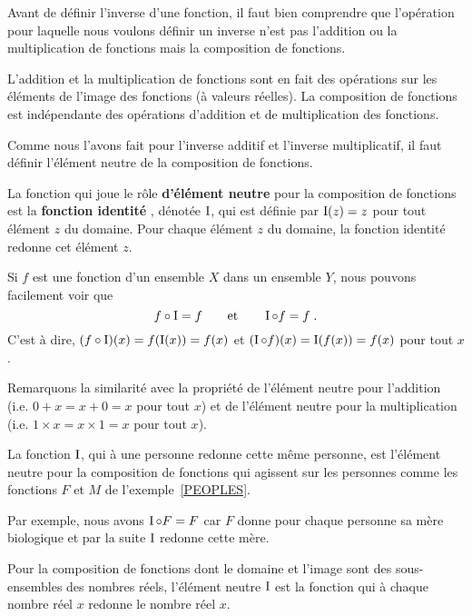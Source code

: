 {Avant de définir l'inverse d'une fonction, il faut bien comprendre que
l'opération pour laquelle nous voulons définir un inverse n'est pas
l'addition ou la multiplication de fonctions mais la composition de
fonctions.

L'addition et la multiplication de fonctions sont en fait des
opérations sur les éléments de l'image des fonctions (à valeurs
réelles).  La composition de fonctions est indépendante des opérations
d'addition et de multiplication des fonctions.

Comme nous l'avons fait pour l'inverse additif et l'inverse multiplicatif,
il faut définir l'élément neutre de la composition de fonctions.

\begin{defn}
La fonction qui joue le rôle {\bfseries d'élément neutre}
 pour la composition de fonctions est la
{\bfseries fonction identité} , dénotée
$\operatorname{I}$, qui est définie par $\operatorname{I}(z) = z$ pour tout élément $z$ du
domaine.  Pour chaque élément $z$ du domaine, la fonction identité
redonne cet élément $z$.
\end{defn}

Si $f$ est une fonction d'un ensemble $X$ dans un ensemble $Y$, nous
pouvons facilement voir que
\[
f \circ \operatorname{I} = f \qquad \text{et} \qquad \operatorname{I} \circ f = f \; .
\]
C'est à dire, $(f\circ \operatorname{I})(x) = f(\operatorname{I}(x)) = f(x)$ et
$(\operatorname{I}\circ f)(x) = \operatorname{I}(f(x))= f(x)$ pour tout $x$.

Remarquons la similarité avec la propriété de l'élément neutre pour
l'addition (i.e. $0 + x = x + 0 = x$ pour tout $x$) et de l'élément
neutre pour la multiplication (i.e. $1 \times x = x \times 1 = x$ pour
tout $x$).

\begin{egg}
La fonction $\operatorname{I}$, qui à une personne redonne cette même personne, est
l'élément neutre pour la composition de fonctions qui agissent sur les
personnes comme les fonctions $F$ et $M$ de l'exemple~\ref{PEOPLES}.

Par exemple, nous avons $\operatorname{I} \circ F = F$ car $F$ donne pour chaque
personne sa mère biologique et par la suite $\operatorname{I}$ redonne cette mère.
\end{egg}

\begin{egg}
Pour la composition de fonctions dont le domaine et l'image sont des
sous-ensembles des nombres réels, l'élément neutre $\operatorname{I}$ est la
fonction qui à chaque nombre réel $x$ redonne le nombre réel $x$.


\end{egg}}
